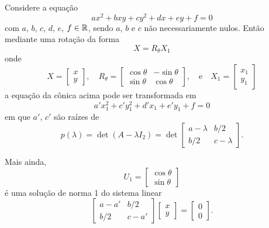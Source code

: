 \begin{teorema}
    Considere a equação
    \[
        ax^2 + bxy + cy^2 + dx + ey + f = 0
    \]
    com $a$, $b$, $c$, $d$, $e$, $f \in \mathbb{R}$, sendo $a$, $b$ e $c$ não necessariamente nulos. Então mediante uma rotação da forma
    \[
        X = R_\theta X_1
    \]
    onde
    \[
        X = \begin{bmatrix}
            x \\y
        \end{bmatrix}, \quad
        R_\theta = \begin{bmatrix}
            \cos\theta & -\sin\theta \\
            \sin\theta & \cos\theta
        \end{bmatrix}, \quad\mbox{e}\quad
        X_1 = \begin{bmatrix}
            x_1 \\y_1
        \end{bmatrix}
    \]
    a equação da cônica acima pode ser transformada em
    \[
        a'x_1^2 + c'y_1^2 + d'x_1 + e'y_1 + f = 0
    \]
    em que $a'$, $c'$ são raízes de
    \[
        p(\lambda) = \det(A - \lambda I_2) = \det \begin{bmatrix}
            a - \lambda & b/2         \\
            b/2         & c - \lambda
        \end{bmatrix}.
    \]

    Mais ainda,
    \[
        U_1 = \begin{bmatrix}
            \cos\theta \\ \sin\theta
        \end{bmatrix}
    \]
    é uma solução de norma 1 do sistema linear
    \[
        \begin{bmatrix}
            a - a' & b/2    \\
            b/2    & c - a'
        \end{bmatrix} \begin{bmatrix}
            x \\y
        \end{bmatrix} = \begin{bmatrix}
            0 \\0
        \end{bmatrix}.
    \]
\end{teorema}


